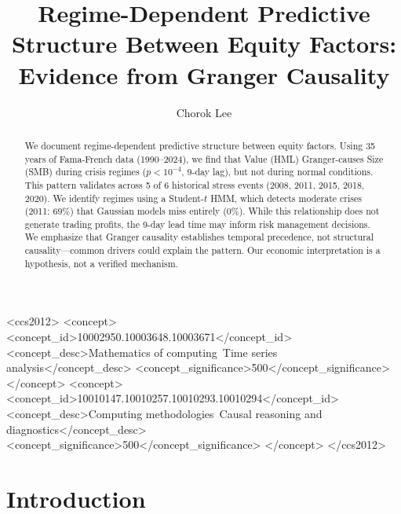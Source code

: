 \documentclass[sigconf]{acmart}
\begin{document}
\title{Regime-Dependent Predictive Structure Between Equity Factors: Evidence from Granger Causality}

\author{Chorok Lee}

\begin{abstract}
We document regime-dependent predictive structure between equity factors.
Using 35 years of Fama-French data (1990--2024), we find that Value (HML)
Granger-causes Size (SMB) during crisis regimes ($p < 10^{-4}$, 9-day lag),
but not during normal conditions. This pattern validates across 5 of 6
historical stress events (2008, 2011, 2015, 2018, 2020).
We identify regimes using a Student-$t$ HMM, which detects moderate crises
(2011: 69\%) that Gaussian models miss entirely (0\%).
While this relationship does not generate trading profits, the 9-day lead
time may inform risk management decisions.
We emphasize that Granger causality establishes temporal precedence, not
structural causality---common drivers could explain the pattern. Our economic
interpretation is a hypothesis, not a verified mechanism.
\end{abstract}

\begin{CCSXML}
<ccs2012>
   <concept>
       <concept_id>10002950.10003648.10003671</concept_id>
       <concept_desc>Mathematics of computing~Time series analysis</concept_desc>
       <concept_significance>500</concept_significance>
   </concept>
   <concept>
       <concept_id>10010147.10010257.10010293.10010294</concept_id>
       <concept_desc>Computing methodologies~Causal reasoning and diagnostics</concept_desc>
       <concept_significance>500</concept_significance>
   </concept>
</ccs2012>
\end{CCSXML}



\maketitle

\section{Introduction}
\end{document}
